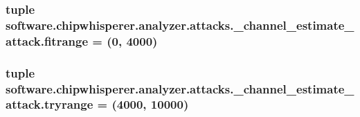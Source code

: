 \subsubsection[{fitrange}]{\setlength{\rightskip}{0pt plus 5cm}tuple software.\+chipwhisperer.\+analyzer.\+attacks.\+\_\+channel\+\_\+estimate\+\_\+attack.\+fitrange = (0, 4000)}\label{namespacesoftware_1_1chipwhisperer_1_1analyzer_1_1attacks_1_1__channel__estimate__attack_a1662e9ab6f7af0176fcf252b14654395}
\hypertarget{namespacesoftware_1_1chipwhisperer_1_1analyzer_1_1attacks_1_1__channel__estimate__attack_acb22ab50a9a058ace0d8488dbe061a3c}{}
\subsubsection[{tryrange}]{\setlength{\rightskip}{0pt plus 5cm}tuple software.\+chipwhisperer.\+analyzer.\+attacks.\+\_\+channel\+\_\+estimate\+\_\+attack.\+tryrange = (4000, 10000)}\label{namespacesoftware_1_1chipwhisperer_1_1analyzer_1_1attacks_1_1__channel__estimate__attack_acb22ab50a9a058ace0d8488dbe061a3c}
